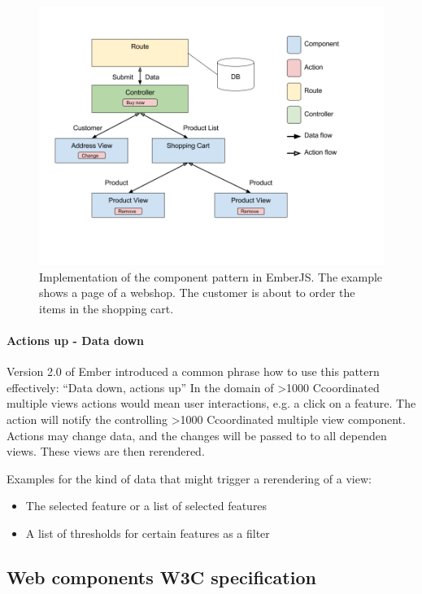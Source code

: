 \documentclass{article}
\newcommand\hmm[1]{\ifnum\ifhmode\spacefactor\else2000\fi>1000 \uppercase{#1}\else#1\fi}
\newcommand{\cmv}{\hmm{c}oordinated multiple view}
\newcommand{\cmvs}{\hmm{c}oordinated multiple views}
\begin{document}
\begin{figure}[h!]
  \centering
  \includegraphics[width=\textwidth]{images/data-down-actions-up.png}
  \caption{Implementation of the component pattern in EmberJS.
  The example shows a page of a webshop.
  The customer is about to order the items in the shopping cart.}
  \label{fig:implementation:frontend-frameworks}
\end{figure}

\paragraph{Actions up - Data down}

Version 2.0 of Ember introduced a common phrase how to use this pattern effectively: ``Data down, actions up''\cite{Emberigniter2017}
In the domain of \cmvs{} actions would mean user interactions, e.g. a click on a feature.
The action will notify the controlling \cmv{} component.
Actions may change data, and the changes will be passed to to all dependen views.
These views are then rerendered.

Examples for the kind of data that might trigger a rerendering of a view:
\begin{itemize}
  \item
    The selected feature or a list of selected features
  \item
    A list of thresholds for certain features as a filter
\end{itemize}

\subsection{Web components W3C specification}
\end{document}
